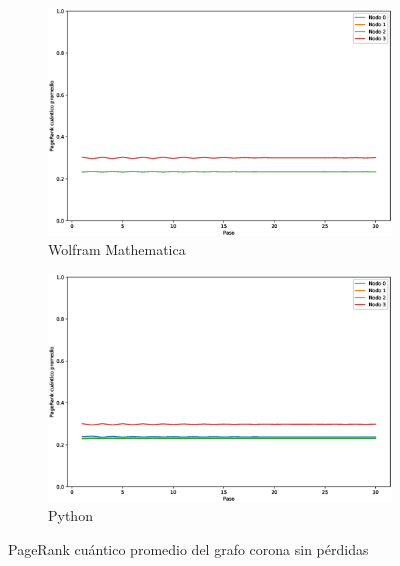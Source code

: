 \documentclass[xetex,mathserif,serif]{beamer}
\begin{document}
\begin{frame}
\begin{figure}[H]
    \centering
    \begin{subfigure}[m]{0.45\textwidth}
        \centering
        \includegraphics[width=0.9\linewidth]{img/crown-mean-M.eps}
        \caption{Wolfram Mathematica}
    \end{subfigure}
    \begin{subfigure}[m]{0.45\textwidth}
        \centering
        \includegraphics[width=0.9\linewidth]{img/crown-mean-lossless.eps}
        \caption{Python}
    \end{subfigure}
    \caption[PageRank cuántico promedio del grafo corona sin pérdidas]{PageRank cuántico promedio del grafo corona sin pérdidas}
    \label{fig:meancrownlossless}
\end{figure}


\end{frame}
\end{document}
